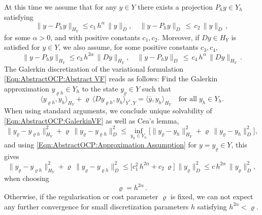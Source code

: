 \documentclass{article}
\numberwithin{equation}{section}
\begin{document}
At this time we assume that for any $y \in Y$ there exists a
projection $P_h y \in Y_h$ satisfying
\begin{equation}\label{Eqn:AbstractOCP:Approximation Assumption}
  \| y - P_h y \|_{H_Y} \leq
  c_1 \, h^\alpha \, \| y \|_D, \quad
  \| y - P_h y \|_D \, \leq \,
  c_2 \, \| y \|_D \, ,
\end{equation}
for some $\alpha > 0$, and with positive constants $c_1, c_2$.
Moreover, if $D y \in H_Y$ is satisfied for $y \in Y$, we also assume,
for some positive constants $c_3, c_4$,
\begin{equation}\label{Eqn:AbstractOCP:Approximation Assumption 2}
  \| y - P_h y \|_{H_Y} \leq
  c_3 \, h^{2\alpha} \, \| D y \|_{H_Y}, \quad
  \| y - P_h y \|_D \, \leq \, 
  c_4 \, h^\alpha \, \| D y \|_{H_Y} \, .
\end{equation}
The Galerkin discretization of the variational formulation
\eqref{Eqn:AbstractOCP:Abstract VF} reads as follows:
Find the Galerkin approximation 
$y_{\varrho h} \in Y_h$ to the state $y_{\varrho} \in Y$ such that 
\begin{equation}\label{Eqn:AbstractOCP:GalerkinVF}
  \langle y_{\varrho h} , y_h \rangle_{H_Y} +
  \varrho \, \langle D y_{\varrho h} , y_h  \rangle_{Y^*,Y} =
  \langle \overline{y} , y_h \rangle_{H_Y} \quad
  \mbox{for all} \; y_h \in Y_h .
\end{equation}
When using standard arguments, we conclude unique solvability of
\eqref{Eqn:AbstractOCP:GalerkinVF} as well as Cea's lemma,
\begin{equation}\label{Eqn:AbstractOCP:AbstractCea}
  \| y_\varrho - y_{\varrho h} \|^2_{H_Y} + \varrho \,
  \| y_\varrho - y_{\varrho h} \|^2_D \leq \inf\limits_{y_h \in Y_h} \Big[
  \| y_\varrho - y_h \|^2_{H_Y} + \varrho \, 
  \| y_\varrho - y_h \|^2_D \Big] ,
\end{equation}
and using \eqref{Eqn:AbstractOCP:Approximation Assumption} for
$y = y_\varrho \in Y$, this gives
\begin{equation}\label{Eqn:AbstractOCP:Error yrho}
  \| y_\varrho - y_{\varrho h} \|^2_{H_Y} + \varrho \,
  \| y_\varrho - y_{\varrho h} \|^2_D \leq 
  \Big[ c_1^2 \, h^{2\alpha} + c_2 \, \varrho \Big] \, \| y_\varrho \|^2_D
  \leq c \, h^{2\alpha} \, \| y_\varrho \|_D^2,
\end{equation}
when choosing
\begin{equation}\label{Eqn:AbstractOCP:Optimal Parameter}
\varrho = h^{2\alpha} \, .
\end{equation}
Otherwise, if the regularisation or cost parameter $\varrho$ is fixed,
we can not expect any further convergence for small discretization
parameters $h$ satisfying $h^{2\alpha} < \varrho$.
\end{document}
